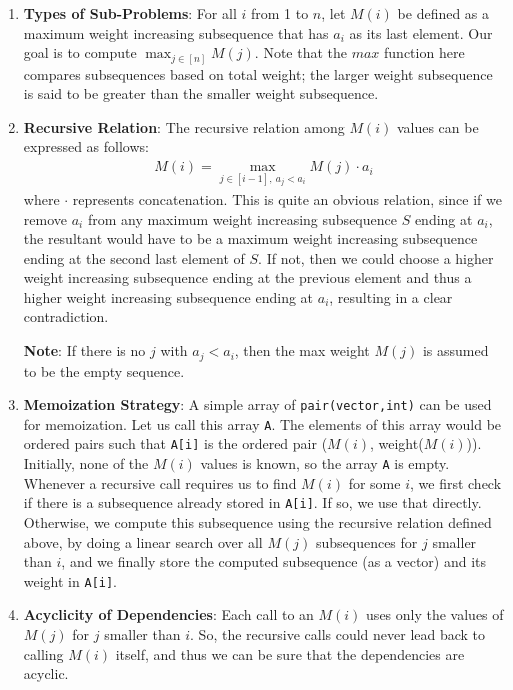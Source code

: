 \documentclass[11pt, fleqn]{article}
\begin{document}
\begin{enumerate}

\item \textbf{Types of Sub-Problems}: For all $i$ from 1 to $n$, let $M(i)$ be defined as a maximum weight increasing subsequence that has $a_i$ as its last element. Our goal is to compute $\max_{j\in [n]} M(j)$. Note that the $max$ function here compares subsequences based on total weight; the larger weight subsequence is said to be greater than the smaller weight subsequence.

\item \textbf{Recursive Relation}: The recursive relation among $M(i)$ values can be expressed as follows:
\begin{align*}
    M(i) = \max_{j\in [i-1],\ a_j < a_i} M(j) \cdot a_i
\end{align*}
where $\cdot$ represents concatenation. This is quite an obvious relation, since if we remove $a_i$ from any maximum weight increasing subsequence $S$ ending at $a_i$, the resultant would have to be a maximum weight increasing subsequence ending at the second last element of $S$. If not, then we could choose a higher weight increasing subsequence ending at the previous element and thus a higher weight increasing subsequence ending at $a_i$, resulting in a clear contradiction.

\medskip

\textbf{Note}: If there is no $j$ with $a_j < a_i$, then the max weight $M(j)$ is assumed to be the empty sequence.

\item \textbf{Memoization Strategy}: A simple array of \texttt{pair(vector,int)} can be used for memoization. Let us call this array \texttt{A}. The elements of this array would be ordered pairs such that \texttt{A[i]} is the ordered pair ($M(i)$, weight($M(i)$)). Initially, none of the $M(i)$ values is known, so the array \texttt{A} is empty. Whenever a recursive call requires us to find $M(i)$ for some $i$, we first check if there is a subsequence already stored in \texttt{A[i]}. If so, we use that directly. Otherwise, we compute this subsequence using the recursive relation defined above, by doing a linear search over all $M(j)$ subsequences for $j$ smaller than $i$, and we finally store the computed subsequence (as a vector) and its weight in \texttt{A[i]}.

\item \textbf{Acyclicity of Dependencies}: Each call to an $M(i)$ uses only the values of $M(j)$ for $j$ smaller than $i$. So, the recursive calls could never lead back to calling $M(i)$ itself, and thus we can be sure that the dependencies are acyclic.


\end{enumerate}
\end{document}
